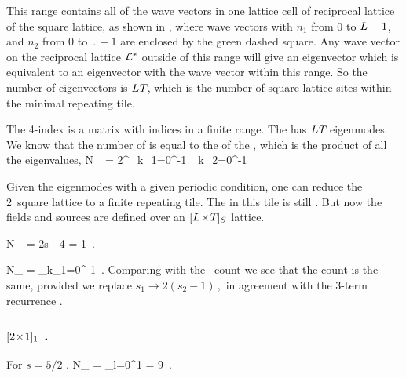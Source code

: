 This range contains all of the wave vectors in one lattice cell of
reciprocal lattice of the square lattice, as shown in
, where wave vectors with $n_1$ from 0
to ${L_{}}-1$, and $n_2$ from 0 to $\period{}-1$ are enclosed by the
green dashed square. Any wave vector on the reciprocal lattice
$\mathcal{L}^*$ outside of this range will give an eigenvector which is
equivalent to an eigenvector with the wave vector within this range. So
the number of eigenvectors is ${L_{}} {T_{}}$, which is the number
of square lattice sites within the minimal repeating tile.

The 4-index {\jacobianOrb}  is a matrix with indices in a
finite range. The {\jacobianOrb} has ${L_{}}{T_{}}$ eigenmodes. We
know that the number of {\twots} is equal to the {\HillDet} of the
{\jacobianOrb}, which is the product of all the eigenvalues,
\beq
N_{\LTS{}{}{}}
=  2^{\speriod{}\period{}}\prod_{k_1=0}^{\speriod{}-1} \prod_{k_2=0}^{\period{}-1}
\label{2DCountingFormula}
\eeq

Given the eigenmodes with a given periodic condition, one can reduce the
2\dmn\ square lattice to a finite repeating tile. The {\sPe} in this tile
is still . But now the fields and sources are defined over an
${[{L_{}}\!\times\!{T_{}}]_{S_{}}}$ lattice.

\beq
N_{} =  2s - 4 = 1
 \,.
\label{1x1DCount}
\eeq

\beq
N_{}
=  \prod_{k_1=0}^{\speriod{}-1}
 \,.
\label{2Dto1DCount}
\eeq
Comparing with the \templatt\ count  we see
that the count is the same, provided we replace
\(
{s}_1\to2({s}_2-1)
\,,
\)
in agreement with the 3-term recurrence .


\subsubsection{${[2\!\times\!1]_{1}}$ \twots.}
\label{s:catLatt2x2rel1}
For $s=5/2$ \catlatt.
\beq
N_{}
= \prod_{l=0}^{1}
= 9
 \,.

